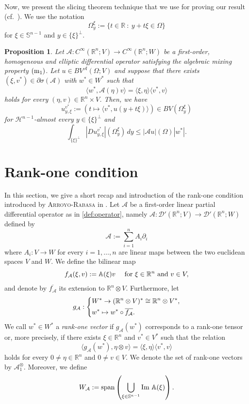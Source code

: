 \documentclass[11pt,reqno]{amsart}
\theoremstyle{plain}
\newtheorem{proposition}[theorem]{Proposition}
\theoremstyle{definition}
\theoremstyle{remark}
\numberwithin{equation}{section}
\newcommand{\R}{\mathbb{R}}
\newcommand{\s}{\mathbb{S}}
\renewcommand{\H}{\mathcal{H}}
\newcommand{\A}{\mathcal{A}}
\newcommand{\D}{\mathcal{D}}
\renewcommand{\AA}{\mathbb{A}}
\newcommand{\1}{\mathbbm{1}} %
\newcommand{\Span}{\textnormal{span}}
\newcommand{\Ima}{\textnormal{Im }}
\begin{document}
Now, we present the slicing theorem technique that we use for proving our result (cf.\ \cite[Proposition 2.1]{AR20}). We use the notation
\[
    \Omega_y^\xi := \{ t \in \R \ : \ y + t\xi \in \Omega \}
\]
for $\xi \in \s^{n-1}$ and $y \in \{\xi \}^\perp$.

\begin{proposition}
\label{prop:slicing_theory}
    Let $\A : C^\infty(\R^n; V) \to C^\infty(\R^n; W)$ be a first-order, homogeneous and elliptic differential operator satisfying the algebraic mixing property $(\textnormal{m}_1)$. Let $u \in BV^\A(\Omega;V)$ and suppose that there exists $(\xi, v^*) \in \partial \sigma(\A)$ with $w^* \in W^*$ such that 
     \[
        \langle w^*, \A(\eta)v\rangle = \langle \xi, \eta \rangle \langle v^*, v \rangle
    \]
    holds for every $(\eta, v) \in \R^n \times V$.
    Then, we have 
    \[
        u^{v^*}_{y,\xi} := (t \mapsto \langle v^*, u(y + t \xi)\rangle) \in BV(\Omega_y^\xi) 
    \]
    for $\H^{n-1}$-almost every $y \in \{\xi\}^\perp$ and 
    \[
        \int_{\{\xi\}^\perp} |D u^{v^*}_{y,\xi}|(\Omega_y^\xi) \, dy \leq |\A u|(\Omega)|w^*|.
    \]
\end{proposition}


\section{Rank-one condition}
\label{sec:rank_one}

In this section, we give a short recap and introduction of the rank-one condition introduced by \textsc{Arroyo-Rabasa} in \cite{AR20}. Let $\A$ be a first-order linear partial differential operator as in \eqref{def:operator}, namely $\A : \D'(\R^n; V) \to \D'(\R^n; W)$ defined by
\begin{equation}
\label{def:oper_first_ord}
    \A := \sum_{i = 1}^n A_i \partial_i
\end{equation}
where $A_i : V \to W$ for every $i = 1, \ldots, n$ are linear maps between the two euclidean spaces $V$ and $W$. We define the bilinear map
\[  
    f_\A(\xi, v) := \AA(\xi) v \quad \textnormal{ for } \xi \in \R^n \textnormal{ and } v \in V,
\]
and denote by $\overline{f_\A}$ its extension to $\R^n \otimes V$. Furthermore, let
\begin{equation}
\label{def:pullback_directional_spectrum}
    g_\A : 
    \begin{dcases}
        W^* \to (\R^n \otimes V)^* \cong \R^n \otimes V^*, \\
        w^* \mapsto w^* \circ \overline{f_\A}.
    \end{dcases}
\end{equation}
We call $w^* \in W^*$ a {\it rank-one vector} if $g_\A(w^*)$ corresponds to a rank-one tensor or, more precisely, if there exists $\xi \in \R^n$ and $v^* \in V^*$ such that the relation
\[
    \langle g_\A(w^*), \eta \otimes v \rangle = \langle \xi, \eta \rangle \langle v^*,v \rangle
\]
holds for every $0 \ne \eta \in \R^n$ and $0 \ne v \in V$. We denote the set of rank-one vectors by $\A_1^\otimes$. Moreover, we define 
\[
    W_\A := \Span \left( \bigcup_{\xi \in \s^{n-1}} \Ima \AA(\xi) \right).
\]
\end{document}
